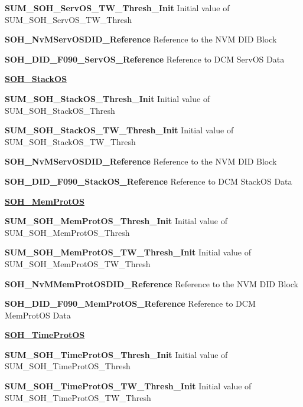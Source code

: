 \textbf{SUM\_SOH\_ServOS\_TW\_Thresh\_Init}\newline
Initial value of SUM\_SOH\_ServOS\_TW\_Thresh

\textbf{SOH\_NvMServOSDID\_Reference}\newline
Reference to the NVM DID Block

\textbf{SOH\_DID\_F090\_ServOS\_Reference}\newline
Reference to DCM ServOS Data

\textbf{\underline{SOH\_StackOS}}\newline

\textbf{SUM\_SOH\_StackOS\_Thresh\_Init}\newline
Initial value of SUM\_SOH\_StackOS\_Thresh

\textbf{SUM\_SOH\_StackOS\_TW\_Thresh\_Init}\newline
Initial value of SUM\_SOH\_StackOS\_TW\_Thresh

\textbf{SOH\_NvMServOSDID\_Reference}\newline
Reference to the NVM DID Block

\textbf{SOH\_DID\_F090\_StackOS\_Reference}\newline
Reference to DCM StackOS Data

\textbf{\underline{SOH\_MemProtOS}}\newline

\textbf{SUM\_SOH\_MemProtOS\_Thresh\_Init}\newline
Initial value of SUM\_SOH\_MemProtOS\_Thresh

\textbf{SUM\_SOH\_MemProtOS\_TW\_Thresh\_Init}\newline
Initial value of SUM\_SOH\_MemProtOS\_TW\_Thresh

\textbf{SOH\_NvMMemProtOSDID\_Reference}\newline
Reference to the NVM DID Block

\textbf{SOH\_DID\_F090\_MemProtOS\_Reference}\newline
Reference to DCM MemProtOS Data

\textbf{\underline{SOH\_TimeProtOS}}\newline

\textbf{SUM\_SOH\_TimeProtOS\_Thresh\_Init}\newline
Initial value of SUM\_SOH\_TimeProtOS\_Thresh

\textbf{SUM\_SOH\_TimeProtOS\_TW\_Thresh\_Init}\newline
Initial value of SUM\_SOH\_TimeProtOS\_TW\_Thresh

